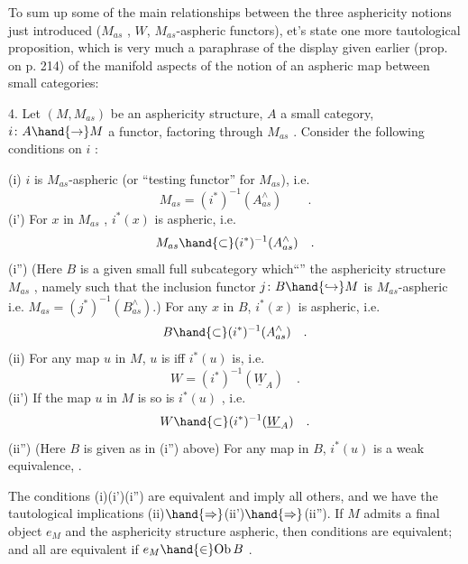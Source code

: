 
To sum up some of the main relationships between the three asphericity
notions just introduced ($M_{as}$ , $W$, $M_{as}$-aspheric functors), et's state
one more tautological proposition, which is very much a paraphrase of
the display given earlier (prop. on p. 214) of the manifold aspects of
the notion of an aspheric map between small categories:

\hand{\uline{\textcolor{black}{Proposition}}} 4. Let $(M,M_{as})$ be an asphericity structure, $A$ a small
category, $i\colon A\hand{\to} M$ a functor, factoring through $M_{as}$ . Consider the
following conditions on $i$ :

(i) $i$ is $M_{as}$-aspheric (or  ``testing functor'' for $M_{as}$), i.e. 
\[ M_{as} = (i^{*})^{-1}(A^{\wedge}_{as}) \qquad . \]
(i') For $x$ in $M_{as}$ , $i^{*}(x)$ is aspheric, i.e.
\[ M_{as} \hand{\subset} (i^{*})^{-1}(A^{\wedge}_{as}) \quad . \]
(i'') (Here $B$ is a given small full subcategory   which``\hand{\uline{\textcolor{black}{generates}}}'' the
asphericity structure $M_{as}$ , namely such that the inclusion functor
$j\colon B\hand{\hookrightarrow} M$ is $M_{as}$-aspheric i.e. $M_{as} = (j^{*})^{-1}(B^{\wedge}_{as})$.) For any $x$ in $B$,
$i^{*}(x)$ is aspheric, i.e.
\[ B \hand{\subset} (i^{*})^{-1}(A^{\wedge}_{as}) \quad . \]
(ii) For any map $u$ in $M$, $u$ is   iff $i^{*}(u)$ is, i.e.
\[ W = (i^{*})^{-1}(\underline{W}_{A}) \quad . \]
(ii') If the map $u$ in $M$ is   so is $i^{*}(u)$ , i.e.
\[ W \hand{\subset} (i^{*})^{-1}(\underline{W}_{A}) \quad . \]
(ii'') (Here $B$ is given as in (i'') above) For any map  in $B$, $i^{*}(u)$
is a weak equivalence, . 

 The conditions (i)(i')(i'') are equivalent and imply all others, and
we have the tautological implications (ii)$\hand{\Rightarrow}$(ii')$\hand{\Rightarrow}$(ii''). If $M$ admits
a final object $e_M$ and  the asphericity structure    aspheric, then  
  conditions  are equivalent; and all  are equivalent if   $e_M \hand{\in} \mathrm{Ob}\, B$ .

